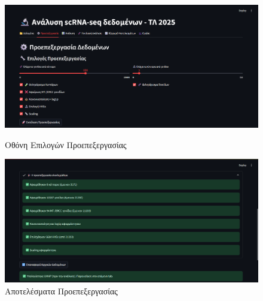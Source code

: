 \begin{figure}[!htb]
  \centering
  \begin{minipage}[t]{0.46\textwidth}
    \centering
    \includegraphics[width=\textwidth]{images/Preprocessing.png}
    \caption*{\small Οθόνη Επιλογών Προεπεξεργασίας}
  \end{minipage}
  \hfill
  \begin{minipage}[t]{0.46\textwidth}
    \centering
    \includegraphics[width=\textwidth]{images/Preprocessing_Result.png}
    \caption*{\small Αποτελέσματα Προεπεξεργασίας}
  \end{minipage}
\end{figure}

